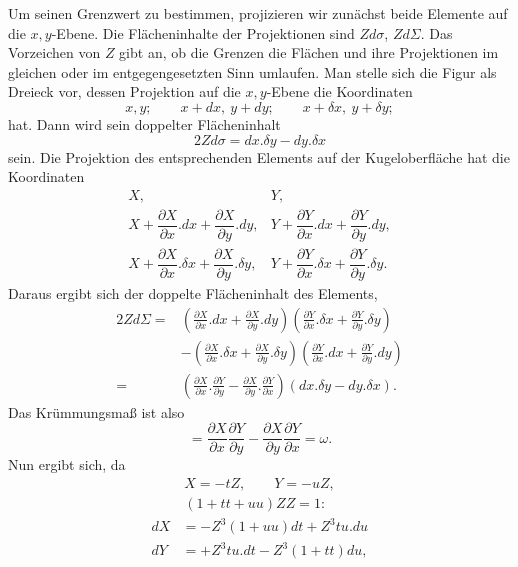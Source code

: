 \par{}%
\noindent\hspace*{1.2em}Um seinen Grenzwert zu bestimmen, projizieren wir zunächst beide Elemente auf die $x,y$-Ebene. Die Flächeninhalte der Projektionen sind $Zd\sigma$, $Zd\Sigma$. Das Vorzeichen von $Z$ gibt an, ob die Grenzen die Flächen und ihre Projektionen im gleichen oder im entgegengesetzten Sinn umlaufen. Man stelle sich die Figur als Dreieck vor, dessen Projektion auf die $x,y$-Ebene die Koordinaten
\[
x,y;\qquad x+dx,\ y+dy;\qquad x+\delta x,\ y+\delta y;
\]
hat. Dann wird sein doppelter Flächeninhalt
\[
2Zd\sigma=dx.\delta y-dy.\delta x
\]
sein. Die Projektion des entsprechenden Elements auf der Kugeloberfläche hat die Koordinaten
\[
\begin{array}{cc}
X,&Y,\\[4pt]
X+\dfrac{\partial X}{\partial x}.dx+\dfrac{\partial X}{\partial y}.dy,&Y+\dfrac{\partial Y}{\partial x}.dx+\dfrac{\partial Y}{\partial y}.dy,\\[6pt]
X+\dfrac{\partial X}{\partial x}.\delta x+\dfrac{\partial X}{\partial y}.\delta y,&Y+\dfrac{\partial Y}{\partial x}.\delta x+\dfrac{\partial Y}{\partial y}.\delta y.
\end{array}
\]
Daraus ergibt sich der doppelte Flächeninhalt des Elements,
\[
\begin{aligned}
2Zd\Sigma={}&\left(\frac{\partial X}{\partial x}.dx+\frac{\partial X}{\partial y}.dy\right)\left(\frac{\partial Y}{\partial x}.\delta x+\frac{\partial Y}{\partial y}.\delta y\right)\\
&-\left(\frac{\partial X}{\partial x}.\delta x+\frac{\partial X}{\partial y}.\delta y\right)\left(\frac{\partial Y}{\partial x}.dx+\frac{\partial Y}{\partial y}.dy\right)\\
={}&\left(\frac{\partial X}{\partial x}.\frac{\partial Y}{\partial y}-\frac{\partial X}{\partial y}.\frac{\partial Y}{\partial x}\right)(dx.\delta y-dy.\delta x).
\end{aligned}
\]
Das Krümmungsmaß ist also
\[
=\frac{\partial X}{\partial x}\frac{\partial Y}{\partial y}-\frac{\partial X}{\partial y}\frac{\partial Y}{\partial x}=\omega.
\]
Nun ergibt sich, da
\[
\begin{gathered}
X=-tZ,\qquad Y=-uZ,\\
(1+tt+uu)ZZ=1:
\end{gathered}
\]
\[
\begin{aligned}
dX&=-Z^{3}(1+uu)dt+Z^{3}tu.du\\
dY&=+Z^{3}tu.dt-Z^{3}(1+tt)du,
\end{aligned}
\]
